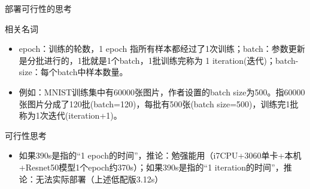 \documentclass{beamer}
\begin{document}
\begin{frame}{部署可行性的思考}	
\begin{exampleblock}{相关名词}
	\begin{itemize}
        \item {\footnotesize epoch：训练的轮数，1 epoch 指所有样本都经过了1次训练；batch：参数更新是分批进行的，1批就是1个batch，1批训练完称为 1 iteration(迭代)；batch-size：每个batch中样本数量。}
        \item {\footnotesize 例如：MNIST训练集中有60000张图片，作者设置的batch size为500。指60000张图片分成了120批(batch=120)，每批有500张(batch size=500)，训练完1批称为1次迭代(iteration+1)。}
    	\end{itemize}
    \end{exampleblock}
\begin{exampleblock}{可行性思考}
	\begin{itemize}
        \item {\footnotesize 如果390s是指的“1 epoch的时间”，推论：勉强能用（i7CPU+3060单卡+本机+Resnet50模型1个epoch约370s）；如果390s是指的“1 iteration的时间”，推论：无法实际部署（上述低配版3.12s）}
    	\end{itemize}
    \end{exampleblock}
\end{frame}
\end{document}
